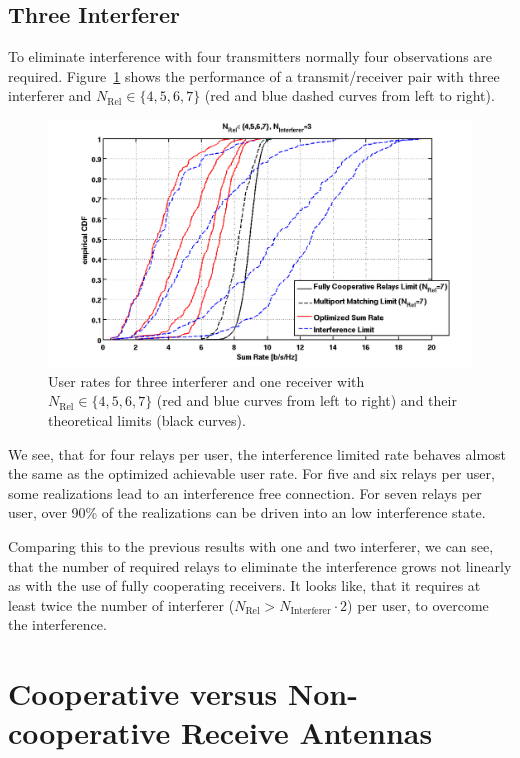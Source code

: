 \subsection{Three Interferer}
\label{sec:3interf}
To eliminate interference with four transmitters normally four observations are required.
Figure~\ref{fig:relcomp_3} shows the performance of a transmit/receiver pair with three interferer and $N_\text{Rel}\in\{4,5,6,7\}$ (red and blue dashed curves from left to right).
\begin{figure}[h]
\centering
  \includegraphics[width=0.85\linewidth]{images/Relcomparison_3interferer.png}
\caption{User rates for three interferer and one receiver with $N_\text{Rel}\in\{4,5,6,7\}$ (red and blue curves from left to right) and their theoretical limits (black curves).}
\label{fig:relcomp_3}
\end{figure}

We see, that for four relays per user, the interference limited rate behaves almost the same as the optimized achievable user rate.
For five and six relays per user, some realizations lead to an interference free connection.
For seven relays per user, over 90\% of the realizations can be driven into an low interference state.

Comparing this to the previous results with one and two interferer, we can see, that  the number of required relays to eliminate the interference grows not linearly as with the use of fully cooperating receivers.
It looks like, that it requires at least twice the number of interferer ($N_\text{Rel} > N_\text{Interferer}\cdot2$) per user, to overcome the interference.

\section{Cooperative versus Non-cooperative Receive Antennas}
\label{sec:rel_rx_comp}

